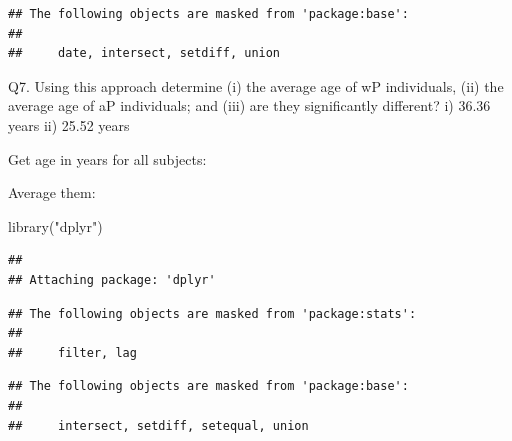 \documentclass[
]{article}
\newenvironment{Shaded}{\begin{snugshade}}{\end{snugshade}}
\newcommand{\CommentTok}[1]{\textcolor[rgb]{0.56,0.35,0.01}{\textit{#1}}}
\newcommand{\FunctionTok}[1]{\textcolor[rgb]{0.00,0.00,0.00}{#1}}
\newcommand{\NormalTok}[1]{#1}
\newcommand{\OtherTok}[1]{\textcolor[rgb]{0.56,0.35,0.01}{#1}}
\newcommand{\SpecialCharTok}[1]{\textcolor[rgb]{0.00,0.00,0.00}{#1}}
\newcommand{\StringTok}[1]{\textcolor[rgb]{0.31,0.60,0.02}{#1}}
\begin{document}
\begin{verbatim}
## The following objects are masked from 'package:base':
## 
##     date, intersect, setdiff, union
\end{verbatim}

Q7. Using this approach determine (i) the average age of wP individuals,
(ii) the average age of aP individuals; and (iii) are they significantly
different? i) 36.36 years ii) 25.52 years

Get age in years for all subjects:

\begin{Shaded}
\end{Shaded}

Average them:

\begin{Shaded}
\begin{Highlighting}[]
\FunctionTok{library}\NormalTok{(}\StringTok{"dplyr"}\NormalTok{)}
\end{Highlighting}
\end{Shaded}

\begin{verbatim}
## 
## Attaching package: 'dplyr'
\end{verbatim}

\begin{verbatim}
## The following objects are masked from 'package:stats':
## 
##     filter, lag
\end{verbatim}

\begin{verbatim}
## The following objects are masked from 'package:base':
## 
##     intersect, setdiff, setequal, union
\end{verbatim}

\begin{Shaded}
\end{Shaded}
\end{document}
